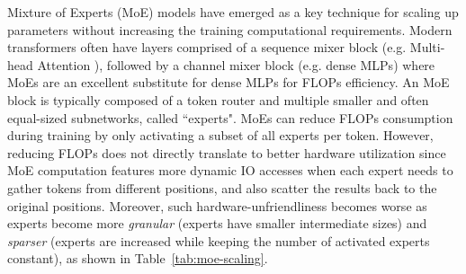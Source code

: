 Mixture of Experts (MoE) \citep{shazeer2017outrageouslylargeneuralnetworks} models have emerged as a key technique for scaling up parameters \citep{deepseekv3insights,kimiteam2025kimik2openagentic} without increasing the training computational requirements. Modern transformers often have layers comprised of a sequence mixer block (e.g. Multi-head Attention \citep{vaswani2023attentionneed}), followed by a channel mixer block (e.g. dense MLPs) where MoEs are an excellent substitute for dense MLPs for FLOPs efficiency. An MoE block is typically composed of a token router and multiple smaller and often equal-sized subnetworks, called ``experts". MoEs can reduce FLOPs consumption during training by only activating a subset of all experts per token. However, reducing FLOPs does not directly translate to better hardware utilization since MoE computation features more dynamic IO accesses when each expert needs to gather tokens from different positions, and also scatter the results back to the original positions. Moreover, such hardware-unfriendliness becomes worse as experts become more \emph{granular} (experts have smaller intermediate sizes) and \emph{sparser} (experts are increased while keeping the number of activated experts constant), as shown in Table~\ref{tab:moe-scaling}.









